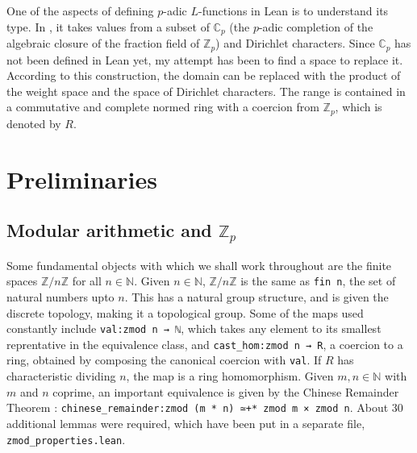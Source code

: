 \documentclass[11pt]{article}
\newcommand{\lean}[1]{\texttt{#1}\xspace} %
\begin{document}
One of the aspects of defining $p$-adic $L$-functions in Lean is to understand its type. In \cite{cyc}, 
it takes values from a subset of $\mathbb{C}_p$ (the $p$-adic completion of the algebraic closure of 
the fraction field of $\mathbb{Z}_p$) and Dirichlet characters. Since $\mathbb{C}_p$ 
has not been defined in Lean yet, my attempt has been to find a space to replace it. According to 
this construction, the domain can be replaced with the product of the weight space and the space of 
Dirichlet characters. The range is contained in a commutative and complete normed ring with a 
coercion from $\mathbb{Z}_p$, which is denoted by $R$.

\section{Preliminaries}
\subsection{Modular arithmetic and $\mathbb{Z}_p$}
Some fundamental objects with which we shall work throughout are the finite spaces $\mathbb{Z}/n \mathbb{Z}$ for all $n \in \mathbb{N}$. Given $n \in \mathbb{N}$, 
$\mathbb{Z}/n \mathbb{Z}$ is the same as \lean{fin n}, the set of natural numbers upto $n$. This has a natural group structure, and is given the discrete topology, 
making it a topological group. Some of the maps used constantly include \lean{val:zmod n → ℕ}, which takes any element to its smallest reprentative in the equivalence class, 
and \lean{cast\_hom:zmod n → R}, a coercion to a ring, obtained by composing the canonical coercion with \lean{val}. If $R$ has characteristic 
dividing $n$, the map is a ring homomorphism. Given $m, n \in \mathbb{N}$ with $m$ and $n$ coprime, an important equivalence is given by the Chinese Remainder Theorem : 
\lean{chinese\_remainder:zmod (m * n) ≃+* zmod m × zmod n}. About 30 additional lemmas were required, which have been put in a separate file, \lean{zmod\_properties.lean}. \\
\end{document}
